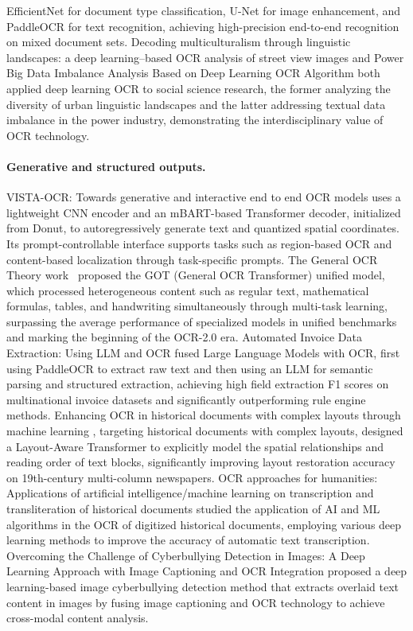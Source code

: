 EfficientNet for document type classification, U-Net for image enhancement, and PaddleOCR for text recognition, achieving high-precision end-to-end recognition on mixed document sets. Decoding multiculturalism through linguistic landscapes: a deep learning–based OCR analysis of street view images \cite{garcia2024linguistic} and Power Big Data Imbalance Analysis Based on Deep Learning OCR Algorithm \cite{zhou2024power} both applied deep learning OCR to social science research, the former analyzing the diversity of urban linguistic landscapes and the latter addressing textual data imbalance in the power industry, demonstrating the interdisciplinary value of OCR technology.

\paragraph{Generative and structured outputs.}
VISTA-OCR: Towards generative and interactive end to end OCR models \cite{vista_ocr_2024} uses a lightweight CNN encoder and an mBART-based Transformer decoder, initialized from Donut, to autoregressively generate text and quantized spatial coordinates. Its prompt-controllable interface supports tasks such as region-based OCR and content-based localization through task-specific prompts. The General OCR Theory work~\cite{got_ocr_2024} proposed the GOT (General OCR Transformer) unified model, which processed heterogeneous content such as regular text, mathematical formulas, tables, and handwriting simultaneously through multi-task learning, surpassing the average performance of specialized models in unified benchmarks and marking the beginning of the OCR-2.0 era. Automated Invoice Data Extraction: Using LLM and OCR \cite{llm_ocr_invoice_2024} fused Large Language Models with OCR, first using PaddleOCR to extract raw text and then using an LLM for semantic parsing and structured extraction, achieving high field extraction F1 scores on multinational invoice datasets and significantly outperforming rule engine methods. Enhancing OCR in historical documents with complex layouts through machine learning \cite{historical_layout_ocr_2023}, targeting historical documents with complex layouts, designed a Layout-Aware Transformer to explicitly model the spatial relationships and reading order of text blocks, significantly improving layout restoration accuracy on 19th-century multi-column newspapers. OCR approaches for humanities: Applications of artificial intelligence/machine learning on transcription and transliteration of historical documents \cite{humanities_ocr_ai_2023} studied the application of AI and ML algorithms in the OCR of digitized historical documents, employing various deep learning methods to improve the accuracy of automatic text transcription. Overcoming the Challenge of Cyberbullying Detection in Images: A Deep Learning Approach with Image Captioning and OCR Integration \cite{cyberbullying_ocr_2024} proposed a deep learning-based image cyberbullying detection method that extracts overlaid text content in images by fusing image captioning and OCR technology to achieve cross-modal content analysis.

